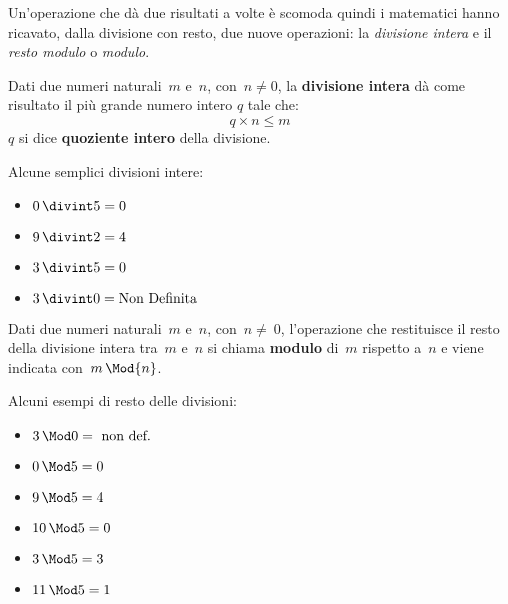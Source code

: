 Un'operazione che dà due risultati a volte è scomoda quindi i matematici 
hanno ricavato, dalla divisione con resto, due nuove operazioni: 
la \emph{divisione intera} e il \emph{resto modulo} o 
\emph{modulo}.

\begin{definizione}{}{}
Dati due numeri naturali~\(m\) e~\(n\), con~\(n \neq 0\), 
la \textbf{divisione intera} dà come risultato il più grande numero 
intero \(q\) tale che:
\[q \times n \leqslant m\]
\(q\) si dice \textbf{quoziente intero} della divisione.
\end{definizione}

\begin{esempio}{}{}
Alcune semplici divisioni intere:
\vspace{-1em}
\begin{htmulticols}{2}
\begin{itemize} [leftmargin=0cm, itemindent=.5cm, noitemsep]
\item \(0\, \divint 5 = 0\)
\item \(9\, \divint 2 = 4\)
\item \(3\, \divint 5 = 0\)
\item \(3\, \divint 0 = \text{Non Definita}\)
\end{itemize}
\end{htmulticols}
\end{esempio}

\begin{definizione}{}{}
Dati due numeri naturali~\(m\) e~\(n\), con~\(n\neq~0\), l'operazione 
che restituisce il resto della divisione intera tra~\(m\) e~\(n\) si 
chiama \textbf{modulo} di~\(m\) rispetto a~\(n\) e viene indicata 
con~\(m\, \Mod {n}\).
\end{definizione}

\begin{esempio}{}{}
Alcuni esempi di resto delle divisioni:
\vspace{-1em}
\begin{htmulticols}{3}
\begin{itemize}  [leftmargin=0cm, itemindent=.5cm, noitemsep]
\item \(3\, \Mod 0 = \text{ non def.}\)
\item \(0\, \Mod 5 = 0\)
\item \(9\, \Mod 5 = 4\)
\item \(10\, \Mod 5 = 0\)
\item \(3\, \Mod 5 = 3\)
\item \(11\, \Mod 5 = 1\)
\end{itemize}
\end{htmulticols}
\end{esempio}

